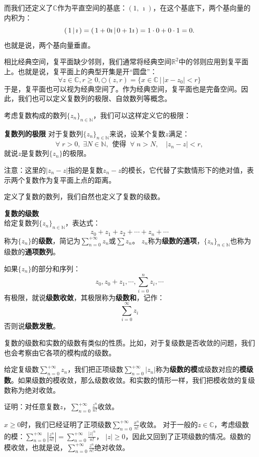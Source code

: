 \documentclass[12pt,UTF8]{ctexbook}
\begin{document}
而我们还定义了$\mathbb{C}$作为平直空间的基底：$(1,\, \imath)$，在这个基底下，两个基向量的内积为：
$$ \displaystyle\left( \,1 \,\middle\vert \,\imath \,\right) = \displaystyle\left( \,1 + 0\imath \,\middle\vert \,0 + 1\imath \,\right) = 1\cdot 0 + 0\cdot 1 = 0.$$
也就是说，两个基向量垂直。

相比经典空间，复平面缺少邻则，我们通常将经典空间$\mathbb{R}^2$中的邻则应用到复平面上。也就是说，复平面上的典型开集是开“圆盘”：
$$ \forall z \in \mathbb{C}, r\geqslant 0,  \bigcirc(z, r) = \{x \in \mathbb{C} \, | \, |x - z_0| < r \} $$
于是，复平面也可以视为经典空间了。作为经典空间，复平面也是完备空间。因此，我们也可以定义复数列的极限、自敛数列等概念。

考虑复数构成的数列$\{z_n\}_{n\in\mathbb{N}}$，我们可以这样定义它的极限：
\begin{df}{\textbf{复数列的极限}}
    对于复数列$\{z_n\}_{n\in\mathbb{N}}$来说，设某个复数$z$满足：
    $$ \forall \;r > 0 ,\; \exists N\in \mathbb{N},\;\, \mbox{使得}\;\; \forall \; n>N, \quad | z_n - z | < r, $$
    就说$z$是复数列$\{z_n\}$的极限。

\end{df}

注意：这里的$|z_n - z|$指的是复数$z_n - z$的模长，它代替了实数情形下的绝对值，表示两个复数作为复平面上点的距离。

定义了复数的数列，我们自然也定义了复数的级数。
\begin{df}{\textbf{复数的级数}}
    \mbox{} \\
    给定复数列$\{z_n\}_{n\in\mathbb{N}}$，表达式：
    $$ z_0 + z_1 + z_2 + \cdots + z_n + \cdots $$
    称为$\{z_n\}$的\textbf{级数}，简记为$\sum_{n=0}^{+\infty} z_n$或$\sum z_n$。
    $z_n$称为\textbf{级数的通项}，$\{z_n\}_{n\in\mathbb{N}}$也称为级数的\textbf{通项数列}。
    
    如果$\{z_n\}$的部分和序列：
    $$ z_0, z_0 + z_1, \cdots , \sum_{i=0}^n z_i, \cdots $$
    有极限，就说\textbf{级数收敛}，其极限称为\textbf{级数和}，记作：
    $$ \sum_{i=0}^\infty z_i $$
    否则说\textbf{级数发散}。
    
\end{df}

复数的级数和实数的级数有类似的性质。比如，对于复级数是否收敛的问题，我们也会考察由它各项的模构成的级数。

给定复级数$\sum_{n=0}^{+\infty} z_n$，我们把正项级数$\sum_{n=0}^{+\infty} |z_n|$称为\textbf{级数的模}或级数对应的\textbf{模级数}。如果级数的模收敛，那么级数收敛。和实数的情形一样，我们把模收敛的复级数称为绝对收敛。

\begin{et}
    证明：对任意复数$z$，$\sum_{n=0}^{+\infty}\frac{z^{n}}{n!}$收敛。
\end{et}
\begin{so}
    $x\geqslant 0$时，我们已经证明了正项级数$\sum_{n=0}^{+\infty}\frac{x^{n}}{n!}$收敛。
    对于一般的$z\in\mathbb{C}$，考虑级数的模：$\sum_{n=0}^{+\infty}\left|\frac{z^{n}}{n!}\right| = \sum_{n=0}^{+\infty}\frac{|z|^{n}}{n!}$，
    $|z|\geqslant 0$，因此又回到了正项级数的情况。级数的模收敛，也就是说，$\sum_{n=0}^{+\infty}\frac{z^{n}}{n!}$绝对收敛。
\end{so}
\end{document}

